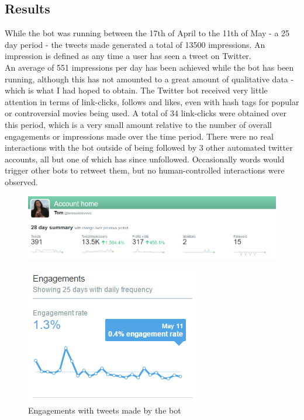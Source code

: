 \subsection{Results}
While the bot was running between the 17th of April to the 11th of May - a 25 day period - the tweets made generated a total of 13500 impressions. An impression is defined as any time a user has seen a tweet on Twitter.\\
An average of 551 impressions per day has been achieved while the bot has been running, although this has not amounted to a great amount of qualitative data - which is what I had hoped to obtain. The Twitter bot received very little attention in terms of link-clicks, follows and likes, even with hash tags for popular or controversial movies being used. A total of 34 link-clicks were obtained over this period, which is a very small amount relative to the number of overall engagements or impressions made over the time period. There were no real interactions with the bot outside of being followed by 3 other automated twitter accounts, all but one of which has since unfollowed. Occasionally words would trigger other bots to retweet them, but no human-controlled interactions were observed. \\
\begin{figure}
	\centering
	\includegraphics[width=0.7\linewidth]{figures/twitter_analytics/28daysummary}
	\caption[Summary of the past 28 days during which the bot was active]{}
	\caption{}
	\label{fig:28daysummary}
\end{figure}

\begin{figure}
\centering
\includegraphics[width=0.7\linewidth]{figures/twitter_analytics/engagements}
\caption{Engagements with tweets made by the bot}
\label{fig:engagements}
\end{figure}

